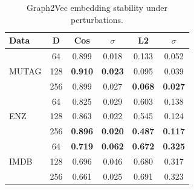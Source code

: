 
\begin{table}
\centering
\footnotesize
\setlength{\tabcolsep}{3pt}
\begin{tabular}{l c c c c c}
\hline
\textbf{Data} & \textbf{D} & \textbf{Cos} & \textbf{$\sigma$} & \textbf{L2} & \textbf{$\sigma$} \\
\hline
 & 64  & 0.899 & 0.018 & 0.133 & 0.052 \\
MUTAG & 128 & \textbf{0.910} & \textbf{0.023} & 0.095 & 0.039 \\
 & 256 & 0.899 & 0.027 & \textbf{0.068} & \textbf{0.027} \\
\hline
   & 64  & 0.825 & 0.029 & 0.603 & 0.138 \\
ENZ   & 128 & 0.863 & 0.022 & 0.545 & 0.124 \\
   & 256 & \textbf{0.896} & \textbf{0.020} & \textbf{0.487} & \textbf{0.117} \\
\hline
 & 64  & \textbf{0.719} & \textbf{0.062} & \textbf{0.672} & \textbf{0.325} \\
IMDB  & 128 & 0.696 & 0.046 & 0.680 & 0.317 \\
  & 256 & 0.661 & 0.025 & 0.691 & 0.323 \\
\hline
\end{tabular}
\caption{Graph2Vec embedding stability under perturbations.}
\label{tab:stability_graph2vec}
\end{table}



